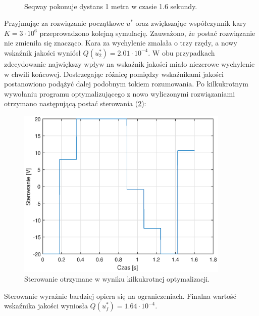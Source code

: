 \begin{figure}[H]
	~~
	\caption{Seqway pokonuje dystans 1 metra w czasie 1.6 sekundy.}
	\label{fig:equ1}
\end{figure}
Przyjmując za rozwiązanie początkowe $u^*$ oraz zwiększając współczynnik kary $K=3\cdot10^6$ przeprowadzono kolejną symulację. Zauważono, że postać rozwiązanie nie zmieniła się znacząco. Kara za wychylenie zmalała o trzy rzędy, a nowy wskaźnik jakości wyniósł    $Q(u_2^*)=2.01\cdot10^{-4}$. W obu przypadkach zdecydowanie największy wpływ na wskaźnik jakości miało niezerowe wychylenie w chwili końcowej. Dostrzegając różnicę pomiędzy wskaźnikami jakości postanowiono podążyć dalej podobnym tokiem rozumowania. Po kilkukrotnym wywołaniu programu optymalizującego z nowo wyliczonymi rozwiązaniami otrzymano następującą postać sterowania (\ref{fig:ctrNew}):
\begin{figure}[H]
	\centering
	\includegraphics[width=4in]{Figures/exp1/controlNew.eps}
	\caption{Sterowanie otrzymane w wyniku kilkukrotnej optymalizacji.}
	\label{fig:ctrNew}
\end{figure}
Sterowanie wyraźnie bardziej opiera się na ograniczeniach. Finalna wartość wskaźnika jakości wyniosła $Q(u_f^*)=1.64\cdot10^{-4}$.